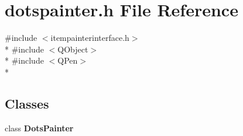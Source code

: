 \section{dotspainter.\+h File Reference}
\label{curve_2painters_2dotspainter_8h}
{\ttfamily \#include $<$itempainterinterface.\+h$>$}\\*
{\ttfamily \#include $<$Q\+Object$>$}\\*
{\ttfamily \#include $<$Q\+Pen$>$}\\*
\subsection*{Classes}
\begin{DoxyCompactItemize}
\item 
class {\bf Dots\+Painter}
\end{DoxyCompactItemize}

